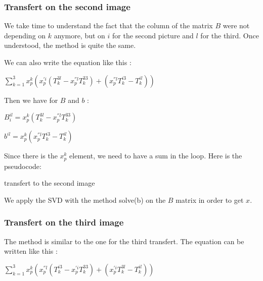 \documentclass{report}
\begin{document}
\subsubsection{Transfert on the second image}
We take time to understand the fact that the column of the matrix $B$ were not depending on $k$ anymore, but on $i$ for the second picture and $l$ for the third. Once understood, the method is quite the same. 

We can also write the equation like this : 

\begin{center}
 $ \displaystyle { \sum_{k = 1}^{3}} x_{p}^{k}(x_{p}^{'i} (T_{k}^{3l} - x_{p}^{''l}T_{k}^{33}) + ( x_{p}^{''l}T_{k}^{i3} - T_{k}^{il} ))$
\end{center}

Then we have for $B$ and $b$ :  
\begin{center}
$B_{i}^{il} = x_{p}^{k}(T_{k}^{3l} - x_{p}^{''l}T_{k}^{33})$
\end{center}
\begin{center}
$b^{il} = x_{p}^{k}(x_{p}^{''l}T_{k}^{i3} - T_{k}^{il})$
\end{center}

Since there is the $x_{p}^{k}$ element, we need to have a sum in the loop. Here is the pseudocode:

\begin{algorithm}
\SetLine
\caption{transfert to the second image}
\SetLine
{}
\end{algorithm}
We apply the SVD with the method solve(b) on the $B$ matrix in order to get $x$. 

\subsubsection{Transfert on the third image}
The method is similar to the one for the third transfert.
The equation can be written like this : 

\begin{center}
 $ \displaystyle { \sum_{k = 1}^{3}} x_{p}^{k}(x_{p}^{''l}(T_{k}^{i3} - x_{p}^{'i}T_{k}^{33}) + ( x_{p}^{'i}T_{k}^{3l} - T_{k}^{il}))$ 
\end{center}
\end{document}
